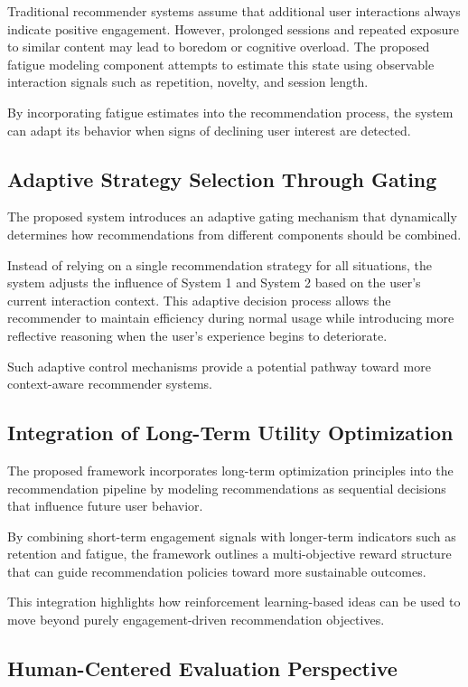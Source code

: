 Traditional recommender systems assume that additional user interactions always indicate positive engagement.
However, prolonged sessions and repeated exposure to similar content may lead to boredom or cognitive overload.
The proposed fatigue modeling component attempts to estimate this state using observable interaction signals such as repetition, novelty, and session length.

By incorporating fatigue estimates into the recommendation process, the system can adapt its behavior when signs of declining user interest are detected.

\subsection{Adaptive Strategy Selection Through Gating}

The proposed system introduces an adaptive gating mechanism that dynamically determines how recommendations from different components should be combined.

Instead of relying on a single recommendation strategy for all situations, the system adjusts the influence of System 1 and System 2 based on the user's current interaction context.
This adaptive decision process allows the recommender to maintain efficiency during normal usage while introducing more reflective reasoning when the user's experience begins to deteriorate.

Such adaptive control mechanisms provide a potential pathway toward more context-aware recommender systems.

\subsection{Integration of Long-Term Utility Optimization}

The proposed framework incorporates long-term optimization principles into the recommendation pipeline by modeling recommendations as sequential decisions that influence future user behavior.

By combining short-term engagement signals with longer-term indicators such as retention and fatigue, the framework outlines a multi-objective reward structure that can guide recommendation policies toward more sustainable outcomes.

This integration highlights how reinforcement learning-based ideas can be used to move beyond purely engagement-driven recommendation objectives.

\subsection{Human-Centered Evaluation Perspective}

